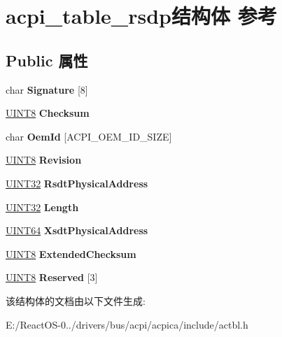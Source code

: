 \hypertarget{structacpi__table__rsdp}{}\section{acpi\+\_\+table\+\_\+rsdp结构体 参考}
\label{structacpi__table__rsdp}
\subsection*{Public 属性}
\begin{DoxyCompactItemize}
\item 
\mbox{\label{structacpi__table__rsdp_a47ef0ec0acfc9bc1d7c13482ee980368}} 
char {\bfseries Signature} \mbox{[}8\mbox{]}
\item 
\mbox{\label{structacpi__table__rsdp_a3ef1316295a44ef053bc28e4dc64516e}} 
\hyperlink{_processor_bind_8h_ab27e9918b538ce9d8ca692479b375b6a}{U\+I\+N\+T8} {\bfseries Checksum}
\item 
\mbox{\label{structacpi__table__rsdp_a3227fa87bf9564f09f82ebbcbf0e602a}} 
char {\bfseries Oem\+Id} \mbox{[}A\+C\+P\+I\+\_\+\+O\+E\+M\+\_\+\+I\+D\+\_\+\+S\+I\+ZE\mbox{]}
\item 
\mbox{\label{structacpi__table__rsdp_a262962205be03aeb0d1aa02ad301ab8c}} 
\hyperlink{_processor_bind_8h_ab27e9918b538ce9d8ca692479b375b6a}{U\+I\+N\+T8} {\bfseries Revision}
\item 
\mbox{\label{structacpi__table__rsdp_a346fe40ace7f1c654fa72d84c5f327cd}} 
\hyperlink{_processor_bind_8h_ae1e6edbbc26d6fbc71a90190d0266018}{U\+I\+N\+T32} {\bfseries Rsdt\+Physical\+Address}
\item 
\mbox{\label{structacpi__table__rsdp_a19096809620f3cea52c5e63e36308dde}} 
\hyperlink{_processor_bind_8h_ae1e6edbbc26d6fbc71a90190d0266018}{U\+I\+N\+T32} {\bfseries Length}
\item 
\mbox{\label{structacpi__table__rsdp_a28ad77494b4b3e479a51fe5dc1f4a744}} 
\hyperlink{_processor_bind_8h_a57be03562867144161c1bfee95ca8f7c}{U\+I\+N\+T64} {\bfseries Xsdt\+Physical\+Address}
\item 
\mbox{\label{structacpi__table__rsdp_a12b3a0842fe41d95cb86ee70b8516bee}} 
\hyperlink{_processor_bind_8h_ab27e9918b538ce9d8ca692479b375b6a}{U\+I\+N\+T8} {\bfseries Extended\+Checksum}
\item 
\mbox{\label{structacpi__table__rsdp_a2c497fef15954c8acb6f6e839d6dd659}} 
\hyperlink{_processor_bind_8h_ab27e9918b538ce9d8ca692479b375b6a}{U\+I\+N\+T8} {\bfseries Reserved} \mbox{[}3\mbox{]}
\end{DoxyCompactItemize}


该结构体的文档由以下文件生成\+:\begin{DoxyCompactItemize}
\item 
E\+:/\+React\+O\+S-\/0../drivers/bus/acpi/acpica/include/actbl.\+h\end{DoxyCompactItemize}
